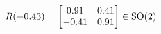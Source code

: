 \documentclass[preview]{standalone}
\begin{document}
\begin{align*}
\special{dvisvgm:raw <g id='unique000'>}R(-0.43) = \begin{bmatrix} 0.91 & 0.41 \\ -0.41 & 0.91 \end{bmatrix} \in \text{SO}(2)\special{dvisvgm:raw </g>}
\end{align*}
\end{document}
